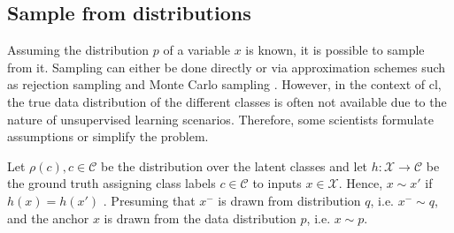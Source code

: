 
\subsection{Sample from distributions}
\label{subsec:SampleViaDistribution}

Assuming the distribution $p$ of a variable $x$ is known, it is possible to sample from it.
Sampling can either be done directly or 
via approximation schemes such as rejection sampling and Monte Carlo sampling \citet{robinson_contrastive_2021}.
However, in the context of \ac{cl}, the true data distribution of the different classes is often not available 
due to the nature of unsupervised learning scenarios.
Therefore, some scientists formulate assumptions or simplify the problem.

Let $\rho(c), c \in \mathcal{C}$ be the distribution over the latent classes and 
let $h: \mathcal{X} \rightarrow \mathcal{C}$ be the ground truth assigning class labels $c \in \mathcal{C}$ to inputs $x \in \mathcal{X}$.
Hence, $x \sim x'$ if $h(x) = h(x')$ \citet{robinson_contrastive_2021,chuang_debiased_2020}.
Presuming that $x^-$ is drawn from distribution $q$, 
i.e. $x^- \sim q$, and the anchor $x$ %
is drawn from the data distribution $p$, i.e. $x \sim p$.








